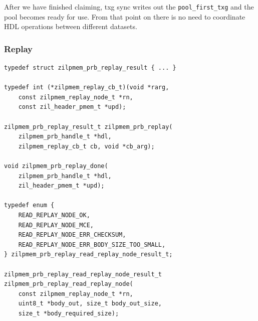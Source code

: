 \documentclass[12pt,a4paper,twoside]{book}
\begin{document}
After we have finished claiming, txg sync writes out the \lstinline{pool_first_txg} and the pool becomes ready for use.
From that point on there is no need to coordinate HDL operations between different datasets.


\subsubsection{Replay}

\begin{lstlisting}
typedef struct zilpmem_prb_replay_result { ... }

typedef int (*zilpmem_replay_cb_t)(void *rarg,
    const zilpmem_replay_node_t *rn,
    const zil_header_pmem_t *upd);

zilpmem_prb_replay_result_t zilpmem_prb_replay(
    zilpmem_prb_handle_t *hdl,
    zilpmem_replay_cb_t cb, void *cb_arg);

void zilpmem_prb_replay_done(
    zilpmem_prb_handle_t *hdl,
    zil_header_pmem_t *upd);

typedef enum {
	READ_REPLAY_NODE_OK,
	READ_REPLAY_NODE_MCE,
	READ_REPLAY_NODE_ERR_CHECKSUM,
	READ_REPLAY_NODE_ERR_BODY_SIZE_TOO_SMALL,
} zilpmem_prb_replay_read_replay_node_result_t;

zilpmem_prb_replay_read_replay_node_result_t
zilpmem_prb_replay_read_replay_node(
    const zilpmem_replay_node_t *rn,
    uint8_t *body_out, size_t body_out_size,
    size_t *body_required_size);
\end{lstlisting}
\end{document}
